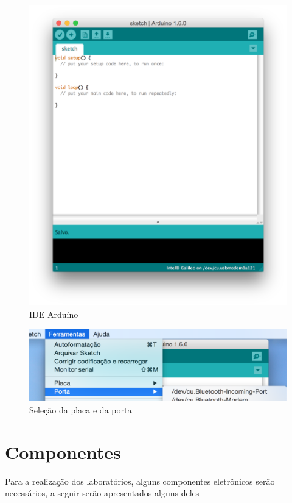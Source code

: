 \begin{figure}[h]
\centering
\includegraphics[scale=0.5]{chapter1/IDE1.png}
\caption{IDE Arduíno}
\label{fig:2}
\end{figure}

\begin{figure}[h]
\centering
\includegraphics[scale=0.6]{chapter1/IDE3.png}
\caption{Seleção da placa e da porta}
\label{fig:3}
\end{figure}

\section{Componentes}
\label{sec:3}

Para a realização dos laboratórios, alguns componentes eletrônicos serão necessários, a seguir serão apresentados alguns deles

